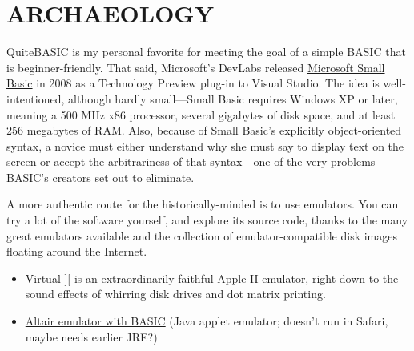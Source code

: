 
\section{ARCHAEOLOGY}


QuiteBASIC is my personal favorite for meeting the goal of a simple
BASIC that is beginner-friendly.  That said,
Microsoft's DevLabs 
released \href{http://smallbasic.com}{Microsoft Small Basic} in 2008 as a
Technology Preview plug-in to Visual Studio.
The idea is well-intentioned, although hardly small---Small Basic
requires Windows XP or later, meaning a 500
MHz x86 processor, several gigabytes of disk space, and at least 256
megabytes of RAM.
Also, because of Small Basic's explicitly
object-oriented syntax,  a novice must either understand why she
must say  to display text on the
screen or accept the arbitrariness of that syntax---one of the very problems
BASIC's creators set out to eliminate.  

A more authentic route for the historically-minded is to use emulators.
You can try a lot of the software yourself, and explore
its source code, thanks to the many great emulators available and the
collection of emulator-compatible disk images floating around the Internet.

\begin{itemize}

\item \href{http://virtualii.com}{Virtual-][} is an extraordinarily
  faithful Apple II emulator, right down to the sound effects of
  whirring disk drives and dot matrix printing.

\item \href{http://web.archive.org/web/20011211231432/http://www.rjh.org.uk/altair/4k/em/altem.htm}{Altair emulator with BASIC} (Java applet emulator; doesn't run in Safari,
maybe needs earlier JRE?)

\end{itemize}



